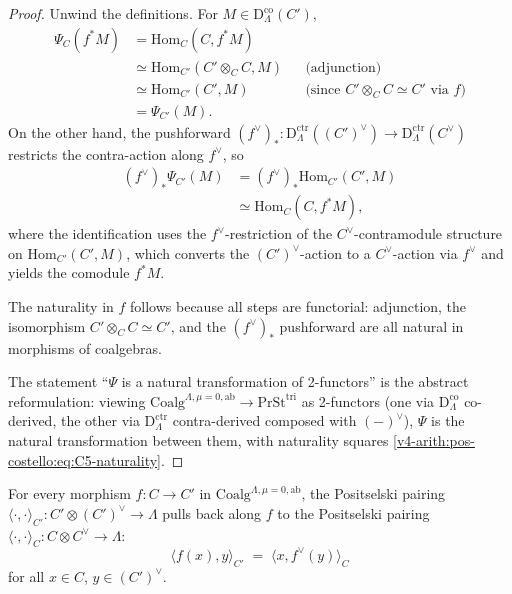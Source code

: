 \begin{proof}
Unwind the definitions. For
\(M\in\mathrm{D}^{\mathrm{co}}_{\Lambda}(C')\),
\begin{align}
\Psi_{C}(f^{*}M) &= \mathrm{Hom}_{C}(C,f^{*}M) \nonumber\\
&\simeq \mathrm{Hom}_{C'}(C'\otimes_{C}C,M) &&\text{(adjunction)} \nonumber\\
&\simeq \mathrm{Hom}_{C'}(C',M) &&\text{(since }C'\otimes_{C}C\simeq C'\text{ via }f\text{)} \nonumber\\
&= \Psi_{C'}(M). \nonumber
\end{align}
On the other hand, the pushforward
\((f^{\vee})_{*}\colon\mathrm{D}^{\mathrm{ctr}}_{\Lambda}((C')^{\vee})\to\mathrm{D}^{\mathrm{ctr}}_{\Lambda}(C^{\vee})\)
restricts the contra-action along \(f^{\vee}\), so
\begin{align}
(f^{\vee})_{*}\Psi_{C'}(M) &= (f^{\vee})_{*}\mathrm{Hom}_{C'}(C',M) \nonumber\\
&\simeq \mathrm{Hom}_{C}(C,f^{*}M), \nonumber
\end{align}
where the identification uses the \(f^{\vee}\)-restriction of the
\(C^{\vee}\)-contramodule structure on \(\mathrm{Hom}_{C'}(C',M)\),
which converts the \((C')^{\vee}\)-action to a \(C^{\vee}\)-action
via \(f^{\vee}\) and yields the comodule \(f^{*}M\).

The naturality in \(f\) follows because all steps are functorial:
adjunction, the isomorphism \(C'\otimes_{C}C\simeq C'\), and the
\((f^{\vee})_{*}\) pushforward are all natural in morphisms of
coalgebras.

The statement ``\(\Psi\) is a natural transformation of 2-functors''
is the abstract reformulation: viewing
\(\mathrm{Coalg}^{\Lambda,\mu=0,\mathrm{ab}}\to\mathrm{PrSt}^{\mathrm{tri}}\)
as 2-functors (one via \(\mathrm{D}^{\mathrm{co}}_{\Lambda}\)
co-derived, the other via \(\mathrm{D}^{\mathrm{ctr}}_{\Lambda}\)
contra-derived composed with \((-)^{\vee}\)), \(\Psi\) is the
natural transformation between them, with naturality squares
\eqref{v4-arith:pos-costello:eq:C5-naturality}.
\end{proof}

\begin{corollary}
\label{v4-arith:pos-costello:cor:functorial-pullback}
For every morphism
\(f\colon C\to C'\) in
\(\mathrm{Coalg}^{\Lambda,\mu=0,\mathrm{ab}}\), the
Positselski pairing
\(\langle\cdot,\cdot\rangle_{C'}\colon C'\otimes (C')^{\vee}\to\Lambda\)
pulls back along \(f\) to the Positselski pairing
\(\langle\cdot,\cdot\rangle_{C}\colon C\otimes C^{\vee}\to\Lambda\):
\begin{equation}
\langle f(x),y\rangle_{C'}\;=\;\langle x,f^{\vee}(y)\rangle_{C}
\end{equation}
for all \(x\in C\), \(y\in (C')^{\vee}\).
\end{corollary}

